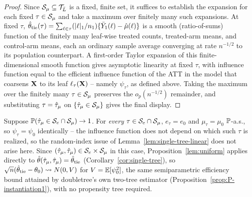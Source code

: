 \documentclass[12pt]{article}
\begin{document}
\begin{proof}
Since $\mathcal{S}_\mu\subseteq\mathcal{T}_{\bar{L}}$ is a fixed, finite set, it suffices to establish the expansion for each fixed $\tau\in\mathcal{S}_\mu$ and take a maximum over finitely many such expansions. At fixed $\tau$, $\hat{\theta}_{\mathrm{tie}}(\tau)=\sum_{\ell\in\tau}(|\ell|_1/n_1)\{\bar Y_1(\ell)-\hat\mu(\ell)\}$ is a smooth (ratio-of-sums) function of the finitely many leaf-wise treated counts, treated-arm means, and control-arm means, each an ordinary sample average converging at rate $n^{-1/2}$ to its population counterpart. A first-order Taylor expansion of this finite-dimensional smooth function gives asymptotic linearity at fixed $\tau$, with influence function equal to the efficient influence function of the ATT in the model that coarsens $\mathbf{X}$ to its leaf $\ell_\tau(\mathbf{X})$ -- namely $\psi_\tau$, as defined above. Taking the maximum over the finitely many $\tau\in\mathcal{S}_\mu$ preserves the $o_p(n^{-1/2})$ remainder, and substituting $\tau=\hat{\tau}_\mu$ on $\{\hat{\tau}_\mu\in\mathcal{S}_\mu\}$ gives the final display.
\end{proof}

\begin{corollary}
\label{cor:single-tree-saturated}
Suppose $\mathbb{P}(\hat{\tau}_\mu\in\mathcal{S}_e\cap\mathcal{S}_\mu)\to1$. For \emph{every} $\tau\in\mathcal{S}_e\cap\mathcal{S}_\mu$, $e_\tau=e_0$ and $\mu_\tau=\mu_0$ $\mathbb{P}$-a.s., so $\psi_\tau=\psi_0$ identically -- the influence function does not depend on which such $\tau$ is realized, so the random-index issue of Lemma~\ref{lem:single-tree-linear} does not arise here. Since $(\hat{\tau}_\mu,\hat{\tau}_\mu)\in\mathcal{S}_e\times\mathcal{S}_\mu$ in this case, Proposition~\ref{lem:uniform} applies directly to $\hat{\theta}(\hat{\tau}_\mu,\hat{\tau}_\mu)=\hat{\theta}_{\mathrm{tie}}$ (Corollary~\ref{cor:single-tree}), so $\sqrt n(\hat{\theta}_{\mathrm{tie}}-\theta_0)\rightsquigarrow N(0,V)$ for $V=\mathbb{E}[\psi_0^2]$, the same semiparametric efficiency bound attained by doubletree's own two-tree estimator (Proposition~\ref{prop:P-instantiation1}), with no propensity tree required.
\end{corollary}
\end{document}
